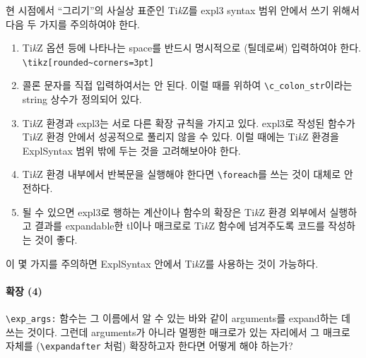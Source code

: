 \documentclass[a4paper,amsmath]{oblivoir}
\newcommand\tikzlogo{Ti\textit{k}Z}
\begin{document}
현 시점에서 “그리기”의 사실상 표준인 \tikzlogo 를 expl3 syntax 범위 안에서 쓰기 위해서 다음 두 가지를 주의하여야 한다.

\begin{enumerate}[(1)] \firmlist
\item \tikzlogo{} 옵션 등에 나타나는 space를 반드시 명시적으로 (틸데로써) 입력하여야 한다. \\
\verb|\tikz[rounded~corners=3pt]|

\item 콜론 문자를 직접 입력하여서는 안 된다. 이럴 때를 위하여 \verb|\c_colon_str|이라는 string 상수가 정의되어 있다.

\item \tikzlogo{} 환경과 expl3는 서로 다른 확장 규칙을 가지고 있다. expl3로 작성된 함수가 \tikzlogo{} 환경 안에서 성공적으로 풀리지 않을 수 있다. 이럴 때에는 \tikzlogo{} 환경을 ExplSyntax 범위 밖에 두는 것을 고려해보아야 한다.

\item \tikzlogo{} 환경 내부에서 반복문을 실행해야 한다면 \verb|\foreach|를 쓰는 것이 대체로 안전하다.

\item 될 수 있으면 expl3로 행하는 계산이나 함수의 확장은 \tikzlogo{} 환경 외부에서 실행하고 결과를 expandable한 tl이나 매크로로 \tikzlogo{} 함수에 넘겨주도록 코드를 작성하는 것이 좋다.
\end{enumerate}

이 몇 가지를 주의하면 ExplSyntax 안에서 \tikzlogo 를 사용하는 것이 가능하다.


\paragraph{확장 (4)}

\verb|\exp_args:| 함수는 그 이름에서 알 수 있는 바와 같이 arguments를 expand하는 데 쓰는 것이다. 그런데 arguments가 아니라 멀쩡한 매크로가 있는 자리에서 그 매크로 자체를 (\verb|\expandafter| 처럼) 확장하고자 한다면 어떻게 해야 하는가?
\end{document}
